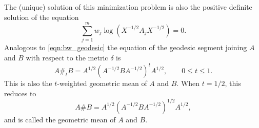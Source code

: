 \documentclass[11pt,a4paper]{article}
\begin{document}
\begin{remark}
    The (unique) solution of this minimization problem is also the positive definite solution of the equation
    \begin{equation}
        \sum_{j=1}^m w_j\log (X^{-1/2}A_j X^{-1/2}) = 0.
    \end{equation}
    Analogous to \eqref{eqn:bw_geodesic} the equation of the geodesic segment joining $A$ and $B$ with respect to the metric $\delta$ is 
    \begin{equation}\label{eqn:cartain_geodesic}
        A\#_t B = A^{1/2}(A^{-1/2}B A^{-1/2})^t A^{1/2}, \qquad 0\le t\le 1.
    \end{equation}
    This is also the $t$-weighted geometric mean of $A$ and $B$. When $t = 1/2$, this reduces to 
    \begin{equation}\label{eqn:cartain_mean_midpoint}
        A\# B = A^{1/2}(A^{-1/2}B A^{-1/2})^{1/2} A^{1/2},
    \end{equation}
    and is called the geometric mean of $A$ and $B$.
\end{remark}


    
    
    
    
\end{document}
